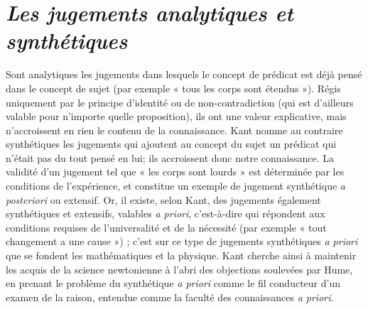 
\section{{\it Les jugements analytiques et synthétiques}}

Sont analytiques les jugements dans lesquels
le concept de prédicat est déjà
pensé dans le concept de sujet (par exemple
« tous les corps sont étendus »). Régis
uniquement par le principe d'identité ou
de non-contradiction (qui est d’ailleurs
valable pour n’importe quelle proposition),
ils ont une valeur explicative, mais
n’accroissent en rien le contenu de la
connaissance. Kant nomme au contraire
synthétiques les jugements qui ajoutent
au concept du sujet un prédicat qui n’était
pas du tout pensé en lui; ils accroissent
donc notre connaissance. La validité d’un
jugement tel que « les corps sont lourds »
est déterminée par les conditions de l’expérience,
et constitue un exemple de jugement
synthétique {\it a posteriori} ou extensif.
Or, il existe, selon Kant, des jugements
également synthétiques et  extensifs,
valables {\it a priori}, c'est-à-dire qui répondent
aux conditions requises de l’universalité
et de la nécessité (par exemple
« tout changement a une cause ») ; c’est
sur ce type de jugements synthétiques {\it a
priori} que se fondent les mathématiques
et la physique. Kant cherche ainsi à maintenir
les acquis de la science newtonienne
à l'abri des objections soulevées par
Hume, en prenant le problème du synthétique
{\it a priori} comme le fil conducteur
d’un examen de la raison, entendue
comme la faculté des connaissances {\it a
priori}.
